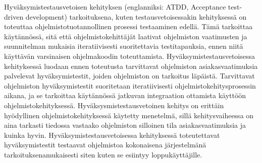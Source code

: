 Hyväksymistestausvetoisen kehityksen (englanniksi: ATDD, Acceptance test-driven development) tarkoituksena, kuten testausvetoisessakin kehityksessä on toteuttaa ohjelmistotuotannollinen prosessi testaaminen edellä.
Tämä tarkoittaa käytännössä, sitä että ohjelmistokehittäjät laativat ohjelmiston vaatimusten ja suunnitelman mukaisia iteratiivisesti suoritettavia testitapauksia, ennen niitä käyttävän varsinaisen ohjelmakoodin toteuttamista.
Hyväksymistestausvetoisessa kehityksessä luodaan ennen toteutusta tarvittavat ohjelmiston asiakasvaatimuksia palvelevat hyväksymistestit, joiden ohjelmiston on tarkoitus läpäistä.
Tarvittavat ohjelmiston hyväksymistestit suoritetaan iteratiivisesti ohjelmistokehitysprosessin aikana, ja se tarkoittaa käytännössä jatkuvan integraation ottamista käyttöön ohjelmistokehityksessä.
Hyväksysmistestausvetoinen kehitys on erittäin hyödyllinen ohjelmistokehityksessä käytetty menetelmä, sillä kehitysvaiheessa on aina tarkasti tiedossa vastaako ohjelmiston silloinen tila asiakasvaatimuksia ja kuinka hyvin.
Hyväksymistestausvetoisessa kehityksessä toteutettavat hyväksymistestit testaavat ohjelmistoa kokonaisena järjestelmänä tarkoituksenamukaisesti siten kuten se esiintyy loppukäyttäjille.
